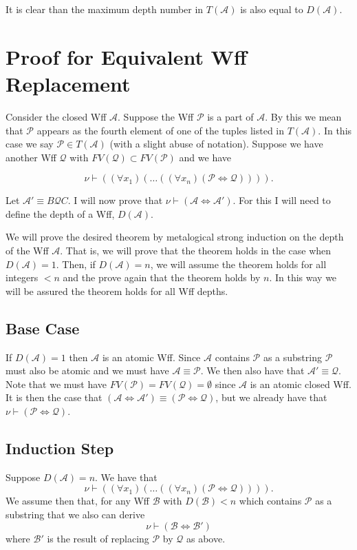 \documentclass[12pt]{article}
\newcommand{\mc}[1]{\mathcal{#1}}
\begin{document}
It is clear than the maximum depth number in $T(\mc{A})$ is also equal to $D(\mc{A})$.

\newpage

\section{Proof for Equivalent Wff Replacement}

Consider the closed Wff $\mc{A}$.
Suppose the Wff $\mc{P}$ is a part of $\mc{A}$. By this we mean that $\mc{P}$ appears as the fourth element of one of the tuples listed in $T(\mc{A})$. In this case we say $\mc{P} \in T(\mc{A})$ (with a slight abuse of notation).
Suppose we have another Wff $\mc{Q}$ with $FV(\mc{Q}) \subset FV(\mc{P})$ and we have

$$
\nu \vdash ((\forall x_1)(\ldots((\forall x_n) (\mc{P} \iff \mc{Q})))).
$$

Let $\mc{A}' \equiv B\mc{Q}C$. I will now prove that $\nu \vdash (\mc{A} \iff \mc{A}')$. 
For this I will need to define the depth of a Wff, $D(\mc{A})$.



We will prove the desired theorem by metalogical strong induction on the depth of the Wff $\mc{A}$.
That is, we will prove that the theorem holds in the case when $D(\mc{A}) = 1$.
Then, if $D(\mc{A}) = n$, we will assume the theorem holds for all integers $<n$ and the prove again that the theorem holds by $n$. 
In this way we will be assured the theorem holds for all Wff depths.

\subsection*{Base Case}

If $D(\mc{A}) = 1$ then $\mc{A}$ is an atomic Wff.
Since $\mc{A}$ contains $\mc{P}$ as a substring $\mc{P}$ must also be atomic and we must have $\mc{A} \equiv \mc{P}$.
We then also have that $\mc{A}' \equiv \mc{Q}$.
Note that we must have $FV(\mc{P}) = FV(\mc{Q}) = \emptyset$ since $\mc{A}$ is an atomic closed Wff.
It is then the case that $(\mc{A} \iff \mc{A}') \equiv (\mc{P} \iff \mc{Q})$, but we already have that $\nu \vdash (\mc{P} \iff \mc{Q})$.

\subsection*{Induction Step}

Suppose $D(\mc{A}) = n$.
We have that 
$$
\nu \vdash ((\forall x_1)(\ldots((\forall x_n) (\mc{P} \iff \mc{Q})))).
$$
We assume then that, for any Wff $\mc{B}$ with $D(\mc{B}) < n$ which contains $\mc{P}$ as a substring that we also can derive
$$
\nu \vdash (\mc{B} \iff \mc{B}')
$$
where $\mc{B}'$ is the result of replacing $\mc{P}$ by $\mc{Q}$ as above.
\end{document}
